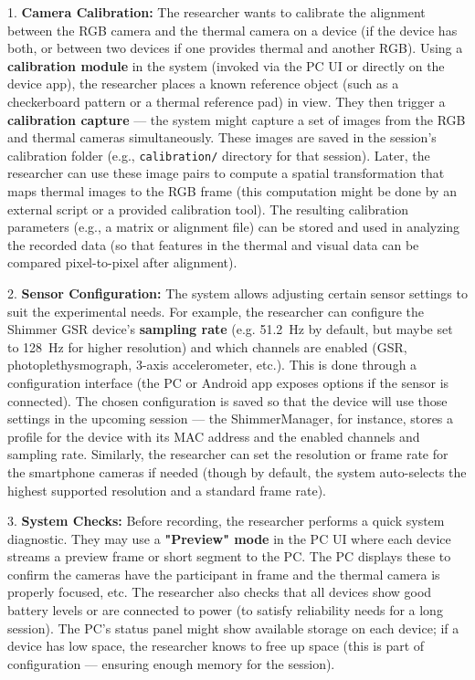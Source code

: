 1.  \textbf{Camera Calibration:} The researcher wants to calibrate the
    alignment between the RGB camera and the thermal camera on a device
    (if the device has both, or between two devices if one provides
    thermal and another RGB). Using a \textbf{calibration module} in the
    system (invoked via the PC UI or directly on the device app), the
    researcher places a known reference object (such as a checkerboard
    pattern or a thermal reference pad) in view. They then trigger a
    \textbf{calibration capture} --- the system might capture a set of images
    from the RGB and thermal cameras simultaneously. These images are
    saved in the session's calibration folder (e.g., \texttt{calibration/}
    directory for that
    session)\cite{ref9}\cite{ref10}.
    Later, the researcher can use these image pairs to compute a spatial
    transformation that maps thermal images to the RGB frame (this
    computation might be done by an external script or a provided
    calibration tool). The resulting calibration parameters (e.g., a
    matrix or alignment file) can be stored and used in analyzing the
    recorded data (so that features in the thermal and visual data can
    be compared pixel-to-pixel after alignment).

2.  \textbf{Sensor Configuration:} The system allows adjusting certain sensor
    settings to suit the experimental needs. For example, the researcher
    can configure the Shimmer GSR device's \textbf{sampling rate} (e.g.
    51.2 Hz by default, but maybe set to 128 Hz for higher resolution)
    and which channels are enabled (GSR, photoplethysmograph, 3-axis
    accelerometer,
    etc.)\cite{ref22}\cite{ref23}.
    This is done through a configuration interface (the PC or Android
    app exposes options if the sensor is connected). The chosen
    configuration is saved so that the device will use those settings in
    the upcoming session --- the ShimmerManager, for instance, stores a
    profile for the device with its MAC address and the enabled channels
    and sampling
    rate\cite{ref24}.
    Similarly, the researcher can set the resolution or frame rate for
    the smartphone cameras if needed (though by default, the system
    auto-selects the highest supported resolution and a standard frame
    rate).

3.  \textbf{System Checks:} Before recording, the researcher performs a quick
    system diagnostic. They may use a \textbf{"Preview" mode} in the PC UI
    where each device streams a preview frame or short segment to the
    PC. The PC displays these to confirm the cameras have the
    participant in frame and the thermal camera is properly focused,
    etc. The researcher also checks that all devices show good battery
    levels or are connected to power (to satisfy reliability needs for a
    long session). The PC's status panel might show available storage on
    each device; if a device has low space, the researcher knows to free
    up space (this is part of configuration --- ensuring enough memory
    for the session).

